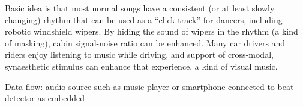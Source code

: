 Basic idea is that most normal songs have a consistent (or at least slowly changing) rhythm that can be used as a “click track” for dancers, including robotic windshield wipers. By hiding the sound of wipers in the rhythm (a kind of masking), cabin signal-\/noise ratio can be enhanced. Many car drivers and riders enjoy listening to music while driving, and support of cross-\/modal, synaesthetic stimulus can enhance that experience, a kind of visual music.

Data flow\+: audio source such as music player or smartphone connected to beat detector as embedded 